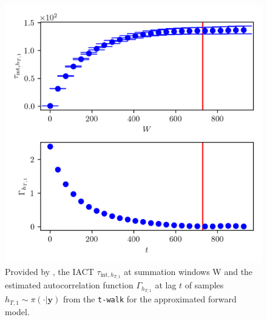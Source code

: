 \begin{figure}[ht!]
	\centering
	\includegraphics{UwerrTauIntTWalk3.png}
	\caption[IACT and autocorrelation function of samples $h_{T,1} \sim \pi(\cdot|\bm{y})$, for approximated model.]{Provided by \cite{drikHesse}, the IACT $\tau_{\text{int},h_{T,1}}$ at summation windows W and the estimated autocorrelation function $\Gamma_{h_{T,1}}$ at lag $t$ of samples $h_{T,1} \sim \pi( \cdot| \bm{y})$ from the \texttt{t-walk} for the approximated forward model.}
	\label{fig:TWalkIATC4}
\end{figure}


